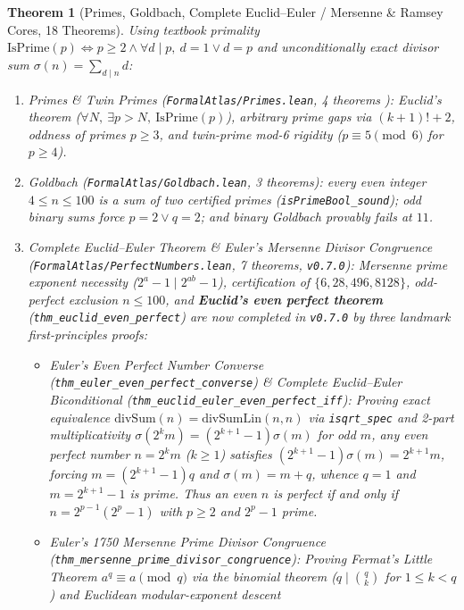 \documentclass[11pt,reqno]{amsart}
\theoremstyle{plain}
\newtheorem{theorem}{Theorem}[section]
\theoremstyle{definition}
\newcommand{\code}[1]{{\upshape\nolinkurl{#1}}}
\begin{document}
\begin{theorem}[Primes, Goldbach, Complete Euclid--Euler / Mersenne \& Ramsey Cores, 18 Theorems]
Using textbook primality $\mathrm{IsPrime}(p) \iff p \ge 2 \land \forall d \mid p,\ d = 1 \lor d = p$
and unconditionally exact divisor sum $\sigma(n) = \sum_{d \mid n} d$:
\begin{enumerate}
  \item \emph{Primes \& Twin Primes (\code{FormalAtlas/Primes.lean}, 4 theorems \cite{zhang2014bounded,maynard2015small}):}
    Euclid's theorem ($\forall N,\ \exists p > N,\ \mathrm{IsPrime}(p)$), arbitrary prime gaps
    via $(k+1)!+2$, oddness of primes $p \ge 3$, and twin-prime mod-6 rigidity ($p \equiv 5 \pmod 6$
    for $p \ge 4$).
  \item \emph{Goldbach (\code{FormalAtlas/Goldbach.lean}, 3 theorems):}
    every even integer $4 \le n \le 100$ is a sum of two certified primes (\code{isPrimeBool_sound});
    odd binary sums force $p=2 \lor q=2$; and binary Goldbach provably fails at $11$.
  \item \emph{Complete Euclid--Euler Theorem \& Euler's Mersenne Divisor Congruence (\code{FormalAtlas/PerfectNumbers.lean}, 7 theorems, \texttt{v0.7.0}):}
    Mersenne prime exponent necessity ($2^a - 1 \mid 2^{ab} - 1$), certification of $\{6, 28, 496, 8128\}$,
    odd-perfect exclusion $n \le 100$, and \textbf{Euclid's even perfect theorem} (\code{thm_euclid_even_perfect})
    are now completed in \texttt{v0.7.0} by three landmark first-principles proofs:
    \begin{itemize}
      \item \emph{Euler's Even Perfect Number Converse (\code{thm_euler_even_perfect_converse}) \& Complete Euclid--Euler Biconditional (\code{thm_euclid_euler_even_perfect_iff}):}
        Proving exact equivalence $\mathrm{divSum}(n) = \mathrm{divSumLin}(n,n)$ via \code{isqrt_spec}
        and 2-part multiplicativity $\sigma(2^k m) = (2^{k+1}-1)\sigma(m)$ for odd $m$, any even
        perfect number $n = 2^k m$ ($k \ge 1$) satisfies $(2^{k+1}-1)\sigma(m) = 2^{k+1} m$, forcing
        $m = (2^{k+1}-1)q$ and $\sigma(m) = m + q$, whence $q = 1$ and $m = 2^{k+1}-1$ is prime.
        Thus an even $n$ is perfect \emph{if and only if} $n = 2^{p-1}(2^p - 1)$ with $p \ge 2$ and
        $2^p - 1$ prime.
      \item \emph{Euler's 1750 Mersenne Prime Divisor Congruence (\code{thm_mersenne_prime_divisor_congruence}):}
        Proving Fermat's Little Theorem $a^q \equiv a \pmod q$ via the binomial theorem
        ($q \mid \binom{q}{k}$ for $1 \le k < q$) and Euclidean modular-exponent descent

\end{itemize}
\end{enumerate}
\end{theorem}
\end{document}
